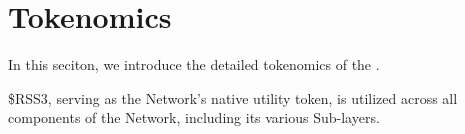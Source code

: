 \section{Tokenomics} 
\label{sec:tokenomics}

In this seciton, we introduce the detailed tokenomics of the .

\$RSS3, serving as the Network's native utility token, is utilized across all components of the Network, including its various Sub-layers.